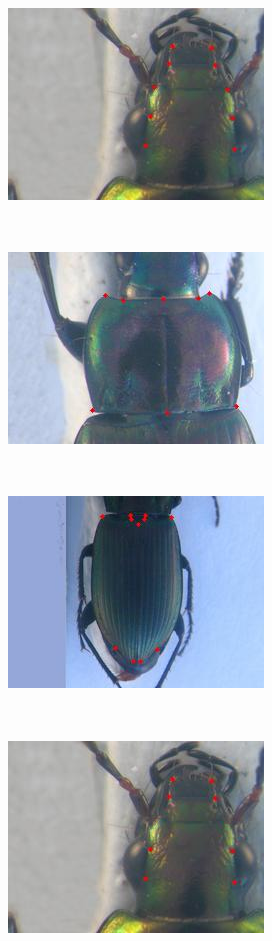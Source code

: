 \documentclass[10pt]{article}
\begin{document}
\begin{figure}[htbp]
    \centering
    \begin{subfigure}[t]{0.16\textwidth}
        \centering
        \includegraphics[scale=0.4]{images/ftete}
    \end{subfigure}%
    ~ 
    \begin{subfigure}[t]{0.16\textwidth}
        \centering
        \includegraphics[scale=0.4]{images/fpronotum}
    \end{subfigure}%
    ~
	\begin{subfigure}[t]{0.156\textwidth}
        \centering
        \includegraphics[scale=0.4]{images/felytre}
    \end{subfigure}~\\    
	\begin{subfigure}[t]{0.156\textwidth}
        \centering
        \includegraphics[scale=0.4]{images/ftete2}

\end{subfigure}
\end{figure}
\end{document}
